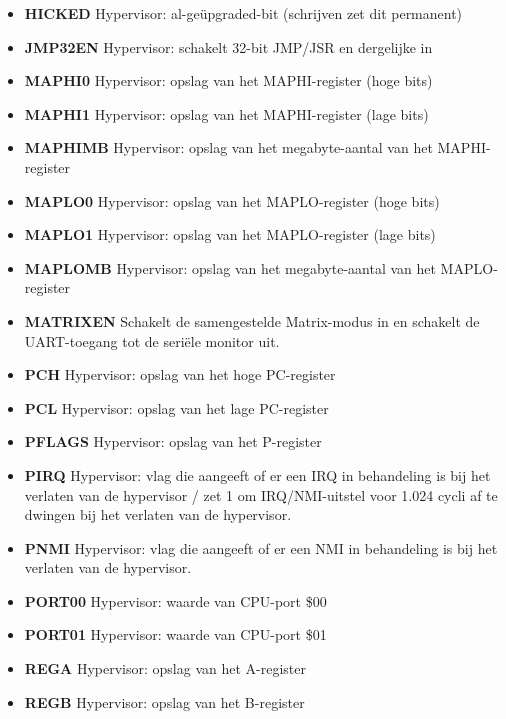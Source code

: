 \begin{itemize}
\item{\bf{HICKED}} Hypervisor: al-geüpgraded-bit (schrijven zet dit permanent)
\item{\bf{JMP32EN}} Hypervisor: schakelt 32-bit JMP/JSR en dergelijke in
\item{\bf{MAPHI0}} Hypervisor: opslag van het MAPHI-register (hoge bits)
\item{\bf{MAPHI1}} Hypervisor: opslag van het MAPHI-register (lage bits)
\item{\bf{MAPHIMB}} Hypervisor: opslag van het megabyte-aantal van het MAPHI-register
\item{\bf{MAPLO0}} Hypervisor: opslag van het MAPLO-register (hoge bits)
\item{\bf{MAPLO1}} Hypervisor: opslag van het MAPLO-register (lage bits)
\item{\bf{MAPLOMB}} Hypervisor: opslag van het megabyte-aantal van het MAPLO-register
\item{\bf{MATRIXEN}} Schakelt de samengestelde Matrix-modus in en schakelt de UART-toegang tot de seriële monitor uit.
\item{\bf{PCH}} Hypervisor: opslag van het hoge PC-register
\item{\bf{PCL}} Hypervisor: opslag van het lage PC-register
\item{\bf{PFLAGS}} Hypervisor: opslag van het P-register
\item{\bf{PIRQ}} Hypervisor: vlag die aangeeft of er een IRQ in behandeling is bij het verlaten van de hypervisor / zet 1 om IRQ/NMI-uitstel voor 1.024 cycli af te dwingen bij het verlaten van de hypervisor.
\item{\bf{PNMI}} Hypervisor: vlag die aangeeft of er een NMI in behandeling is bij het verlaten van de hypervisor.
\item{\bf{PORT00}} Hypervisor: waarde van CPU-port \$00
\item{\bf{PORT01}} Hypervisor: waarde van CPU-port \$01
\item{\bf{REGA}} Hypervisor: opslag van het A-register
\item{\bf{REGB}} Hypervisor: opslag van het B-register

\end{itemize}
